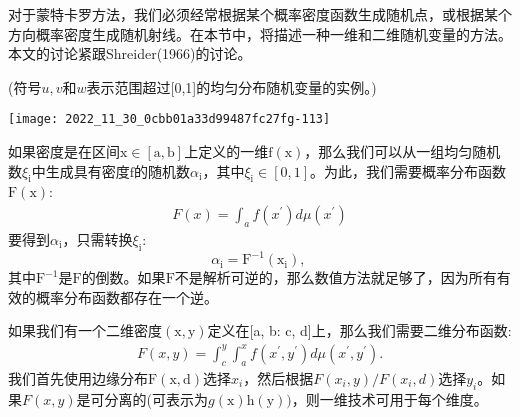 \begin{CJK}{UTF8}{gbsn}
对于蒙特卡罗方法，我们必须经常根据某个概率密度函数生成随机点，或根据某个方向概率密度生成随机射线。在本节中，将描述一种一维和二维随机变量的方法。本文的讨论紧跟Shreider(1966)的讨论。

\begin{table}[htbp]
\small{\caption{(符号$u, v$和$w$表示范围超过[0,1]的均匀分布随机变量的实例。)}}
\centering
\texttt{[image: 2022\_11\_30\_0cbb01a33d99487fc27fg-113]}
\end{table}

如果密度是在区间$\mathrm{x} \in[\mathrm{a}, \mathrm{b}]$上定义的一维$\mathrm{f}(\mathrm{x})$，那么我们可以从一组均匀随机数$\xi_{\mathrm{i}}$中生成具有密度$\mathrm{f}$的随机数$\alpha_{\mathrm{i}}$，其中$\xi_{\mathrm{i}} \in[0,1]$。为此，我们需要概率分布函数$\mathrm{F}(\mathrm{x})$:
\begin{align}
F(x)=\int_{a} f\left(x^{\prime}\right) d \mu\left(x^{\prime}\right)
\end{align}
要得到$\alpha_{\mathrm{i}}$，只需转换$\xi_{\mathrm{i}}$:
$$
\alpha_{\mathrm{i}}=\mathrm{F}^{-1}\left(\mathrm{x}_{\mathrm{i}}\right) \text {, }
$$
其中$\mathrm{F}^{-1}$是$\mathrm{F}$的倒数。如果$\mathrm{F}$不是解析可逆的，那么数值方法就足够了，因为所有有效的概率分布函数都存在一个逆。

如果我们有一个二维密度$(\mathrm{x}, \mathrm{y})$定义在[a, b: c, d]上，那么我们需要二维分布函数:
\begin{align}
F(x, y)=\int_{c}^{y} \int_{a}^{x} f\left(x^{\prime}, y^{\prime}\right) d \mu\left(x^{\prime}, y^{\prime}\right) .
\end{align}
我们首先使用边缘分布$\mathrm{F}(\mathrm{x}, \mathrm{d})$选择$x_i$，然后根据$F\left(x_{i}, y\right) / F\left(x_{i}, d\right)$选择$y_{i}$。如果$F(x, y)$是可分离的(可表示为$g(\mathrm{x}) \mathrm{h}(\mathrm{y}))$，则一维技术可用于每个维度。


\end{CJK}
